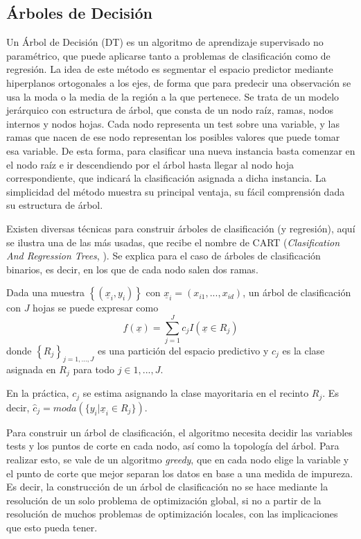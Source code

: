 \documentclass[12pt,a4paper,]{book}
\numberwithin{dummy}{section}
\theoremstyle{ocrenumbox}
\theoremstyle{blacknumex}
\theoremstyle{blacknumbox}
\theoremstyle{ocrenum}
\theoremstyle{ocrenum}
\begin{document}
\hypertarget{uxe1rboles-de-decisiuxf3n}{%
\subsection{Árboles de Decisión}\label{uxe1rboles-de-decisiuxf3n}}

Un Árbol de Decisión (DT) es un algoritmo de aprendizaje supervisado no
paramétrico, que puede aplicarse tanto a problemas de clasificación como
de regresión. La idea de este método es segmentar el espacio predictor
mediante hiperplanos ortogonales a los ejes, de forma que para predecir
una observación se usa la moda o la media de la región a la que
pertenece. Se trata de un modelo jerárquico con estructura de árbol, que
consta de un nodo raíz, ramas, nodos internos y nodos hojas. Cada nodo
representa un test sobre una variable, y las ramas que nacen de ese nodo
representan los posibles valores que puede tomar esa variable. De esta
forma, para clasificar una nueva instancia basta comenzar en el nodo
raíz e ir descendiendo por el árbol hasta llegar al nodo hoja
correspondiente, que indicará la clasificación asignada a dicha
instancia. La simplicidad del método muestra su principal ventaja, su
fácil comprensión dada su estructura de árbol.

Existen diversas técnicas para construir árboles de clasificación (y
regresión), aquí se ilustra una de las más usadas, que recibe el nombre
de CART (\emph{Clasification And Regression Trees},
\citep{breiman1984classification}). Se explica para el caso de árboles
de clasificación binarios, es decir, en los que de cada nodo salen dos
ramas.

Dada una muestra \(\left\{ (\underline x_i,y_i) \right\}\) con
\(\underline x_i = (x_{i1},...,x_{id})\), un árbol de clasificación con
\(J\) hojas se puede expresar como
\[f(\underline x) = \sum_{j=1}^J c_j I(\underline x \in R_j)\] donde
\(\left\{ R_j\right\}_{j=1,...,J}\) es una partición del espacio
predictivo y \(c_j\) es la clase asignada en \(R_j\) para todo
\(j \in {1,...,J}\).

En la práctica, \(c_j\) se estima asignando la clase mayoritaria en el
recinto \(R_j\). Es decir,
\(\hat c_j = moda(\{y_i | \underline x_i \in R_j\})\).

Para construir un árbol de clasificación, el algoritmo necesita decidir
las variables tests y los puntos de corte en cada nodo, así como la
topología del árbol. Para realizar esto, se vale de un algoritmo
\emph{greedy}, que en cada nodo elige la variable y el punto de corte
que mejor separan los datos en base a una medida de impureza. Es decir,
la construcción de un árbol de clasificación no se hace mediante la
resolución de un solo problema de optimización global, si no a partir de
la resolución de muchos problemas de optimización locales, con las
implicaciones que esto pueda tener.
\end{document}
